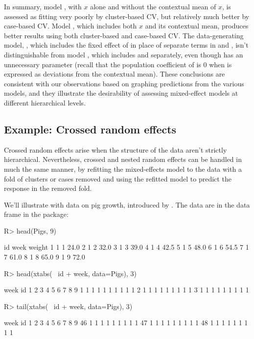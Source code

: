\documentclass[
]{jss}
\begin{document}
In summary, model , with \(x\) alone and without the
contextual mean of \(x\), is assessed as fitting very poorly by
cluster-based CV, but relatively much better by case-based CV. Model
, which includes both \(x\) and its contextual mean,
produces better results using both cluster-based and case-based CV. The
data-generating model, , which includes the fixed effect of
 in place of separate terms in  and ,
isn't distinguishable from model , which includes 
and  separately, even though  has an unnecessary
parameter (recall that the population coefficient of  is 0 when
 is expressed as deviations from the contextual mean). These
conclusions are consistent with our observations based on graphing
predictions from the various models, and they illustrate the
desirability of assessing mixed-effect models at different hierarchical
levels.

\hypertarget{example-crossed-random-effects}{%
\subsection{Example: Crossed random
effects}\label{example-crossed-random-effects}}

Crossed random effects arise when the structure of the data aren't
strictly hierarchical. Nevertheless, crossed and nested random effects
can be handled in much the same manner, by refitting the mixed-effects
model to the data with a fold of clusters or cases removed and using the
refitted model to predict the response in the removed fold.

We'll illustrate with data on pig growth, introduced by \citet[Table
3.1]{DiggleLiangZeger:1994}. The data are in the  data frame
in the  package:

\begin{CodeChunk}
\begin{CodeInput}
R> head(Pigs, 9)
\end{CodeInput}
\begin{CodeOutput}
  id week weight
1  1    1   24.0
2  1    2   32.0
3  1    3   39.0
4  1    4   42.5
5  1    5   48.0
6  1    6   54.5
7  1    7   61.0
8  1    8   65.0
9  1    9   72.0
\end{CodeOutput}
\begin{CodeInput}
R> head(xtabs(~ id + week, data=Pigs), 3)
\end{CodeInput}
\begin{CodeOutput}
   week
id  1 2 3 4 5 6 7 8 9
  1 1 1 1 1 1 1 1 1 1
  2 1 1 1 1 1 1 1 1 1
  3 1 1 1 1 1 1 1 1 1
\end{CodeOutput}
\begin{CodeInput}
R> tail(xtabs(~ id + week, data=Pigs), 3)
\end{CodeInput}
\begin{CodeOutput}
    week
id   1 2 3 4 5 6 7 8 9
  46 1 1 1 1 1 1 1 1 1
  47 1 1 1 1 1 1 1 1 1
  48 1 1 1 1 1 1 1 1 1
\end{CodeOutput}
\end{CodeChunk}
\end{document}
